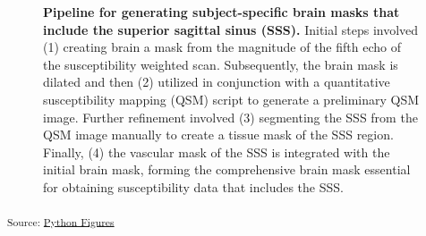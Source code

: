 \documentclass[
true
]{sn-jnl}
\begin{document}
\begin{figure}[H]


\caption{\label{fig-graph}\textbf{Pipeline for generating
subject-specific brain masks that include the superior sagittal sinus
(SSS).} Initial steps involved (1) creating brain a mask from the
magnitude of the fifth echo of the susceptibility weighted scan.
Subsequently, the brain mask is dilated and then (2) utilized in
conjunction with a quantitative susceptibility mapping (QSM) script to
generate a preliminary QSM image. Further refinement involved (3)
segmenting the SSS from the QSM image manually to create a tissue mask
of the SSS region. Finally, (4) the vascular mask of the SSS is
integrated with the initial brain mask, forming the comprehensive brain
mask essential for obtaining susceptibility data that includes the SSS.}

\end{figure}%

\textsubscript{Source:
\href{https://WeberLab.github.io/Chisep_CSVO2_Manuscript/notebooks/Figures.ipynb.html\#cell-fig-graph}{Python
Figures}}
\end{document}
